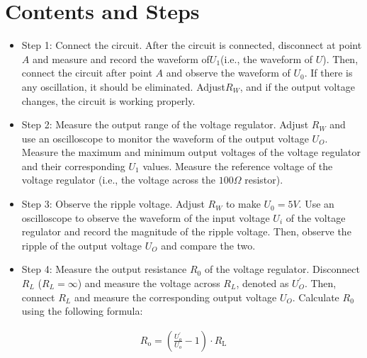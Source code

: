\documentclass[UTF8]{article}
\begin{document}
	\section{Contents and Steps}
	\begin{itemize}
	\item Step 1: Connect the circuit. After the circuit is connected, disconnect at point $A$ and measure and record the waveform of$U_1$(i.e., the waveform of $U$). Then, connect the circuit after point $A$ and observe the waveform of $U_0$. If there is any oscillation, it should be eliminated. Adjust$R_W$, and if the output voltage changes, the circuit is working properly.
    
    \item Step 2: Measure the output range of the voltage regulator. Adjust $R_W$ and use an oscilloscope to monitor the waveform of the output voltage $U_O$. Measure the maximum and minimum output voltages of the voltage regulator and their corresponding $U_1$ values. Measure the reference voltage of the voltage regulator (i.e., the voltage across the $100\Omega$  resistor).
    
    \item Step 3: Observe the ripple voltage. Adjust $R_W$ to make $U_0 = 5V$. Use an oscilloscope to observe the waveform of the input voltage $U_i$ of the voltage regulator and record the magnitude of the ripple voltage. Then, observe the ripple of the output voltage $U_O$ and compare the two.
    
    \item Step 4: Measure the output resistance $R_0$ of the voltage regulator. Disconnect $R_L$ ($R_L = \infty$) and measure the voltage across $R_L$, denoted as $U_O^{\prime}$. Then, connect $R_L$ and measure the corresponding output voltage $U_O$. Calculate $R_0$ using the following formula:
    
    \end{itemize}
    
   \begin{eqnarray}
   R_{\mathrm{o}}=\left(\frac{U_{o}^{\prime}}{U_{o}}-1\right) \cdot R_{\mathrm{L}}
   \end{eqnarray}
\end{document}
